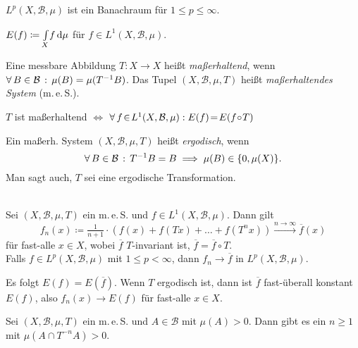 \documentclass{cheat-sheet}
\newcommand{\Bor}{\mathcal{B}} %
\newcommand{\meS}{m.\,e.\,S.} %
\newcommand{\meST}{$(X, \Bor, \mu, T)$} %
\begin{document}
\begin{bem}
  $L^p(X, \Bor, \mu)$ ist ein Banachraum für $1 \leq p \leq \infty$.
\end{bem}

\begin{nota}
  $E(f) \coloneqq {\textstyle \int\limits_{X}^{}} f \,\mathrm{d} \mu$ für $f \in L^1(X, \Bor, \mu)$.
\end{nota}

\begin{defn}
  Eine messbare Abbildung $T : X \to X$ heißt \emph{maßerhaltend}, wenn $\fa{B \in \Bor} \mu(B) = \mu(T^{-1} B)$.
  Das Tupel \meST{} heißt \emph{maßerhaltendes System} (\meS{}).
\end{defn}

\begin{lem}
  $T$ ist maßerhaltend $\!\iff\!$ $\fa{f \!\in\! L^1(X, \Bor, \mu)\!}\! E(f) \!=\! E(f \!\circ\! T)$
\end{lem}

\begin{defn}
  Ein maßerh. System \meST{} heißt \emph{ergodisch}, wenn
  \[ \fa{B \in \Bor} T^{-1} B = B \implies \mu(B) \in \{ 0, \mu(X) \}. \]
  Man sagt auch, $T$ sei eine ergodische Transformation.
\end{defn}

\begin{thm}\mbox{}\\
  Sei \meST{} ein \meS{} und $f \in L^1(X, \Bor, \mu)$. Dann gilt
  \[
    f_n(x) \coloneqq \tfrac{1}{n+1} \cdot \left( f(x) + f(Tx) + \ldots + f(T^n x) \right) \xrightarrow{n \to \infty} \overline{f}(x)
  \]
  für fast-alle $x \in X$, wobei $\overline{f}$ $T$-invariant ist, \dh{} $\overline{f} = \overline{f} \circ T$. \\
  Falls $f \!\in\! L^p(X, \Bor, \mu)$ mit $1 \leq p < \infty$, dann $f_n \to \overline{f}$ in $L^p(X, \Bor, \mu)$.
\end{thm}

\begin{bem}
  Es folgt $E(f) = E(\overline{f})$. Wenn $T$ ergodisch ist, dann ist $\overline{f}$ fast-überall konstant $E(f)$, also $f_n(x) \to E(f)$ für fast-alle $x \in X$.
\end{bem}

\begin{thm}
  Sei \meST{} ein \meS{} und $A \in \Bor$ mit $\mu(A) > 0$.
  Dann gibt es ein $n \geq 1$ mit $\mu(A \cap T^{-n} A) > 0$.
\end{thm}
\end{document}
